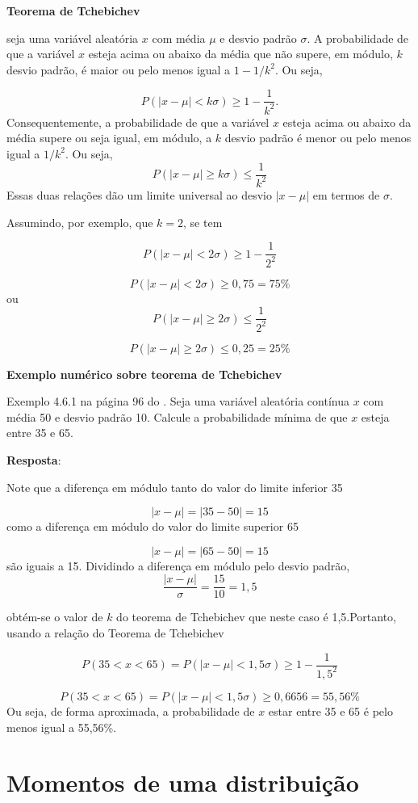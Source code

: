 \documentclass[
]{book}
\begin{document}
\textbf{Teorema de Tchebichev}

seja uma variável aleatória \(x\) com média \(\mu\) e desvio padrão \(\sigma\). A probabilidade de que a variável \(x\) esteja acima ou abaixo da média que não supere, em módulo, \(k\) desvio padrão, é maior ou pelo menos igual a \(1 - 1/k^2\). Ou seja,

\[
  P(|x - \mu| <k\sigma) \geq 1-\dfrac{1}{k^2}.
\]
Consequentemente, a probabilidade de que a variável \(x\) esteja acima ou abaixo da média supere ou seja igual, em módulo, a \(k\) desvio padrão é menor ou pelo menos igual a \(1/k^2\). Ou seja,
\[
  P(|x-\mu| \geq k\sigma) \leq \dfrac{1}{k^2}
\]
Essas duas relações dão um limite universal ao desvio \(|x-\mu|\) em termos de \(\sigma\).

Assumindo, por exemplo, que \(k = 2\), se tem

\[
  P(|x - \mu| <2\sigma) \geq 1-\dfrac{1}{2^2}
\]

\[
  P(|x - \mu| <2\sigma) \geq 0,75 = 75\%
\]
ou
\[
  P(|x-\mu| \geq 2\sigma) \leq \dfrac{1}{2^2}
\]

\[
  P(|x-\mu| \geq 2\sigma) \leq 0,25 = 25\%
\]

\textbf{Exemplo numérico sobre teorema de Tchebichev}

Exemplo 4.6.1 na página 96 do \citet{Sartoris2013}. Seja uma variável aleatória contínua \(x\) com média 50 e desvio padrão 10. Calcule a probabilidade mínima de que \(x\) esteja entre 35 e 65.

\textbf{Resposta}:

Note que a diferença em módulo tanto do valor do limite inferior 35

\[
  |x - \mu| = |35 - 50| = 15
\]
como a diferença em módulo do valor do limite superior 65

\[
  |x - \mu| = |65 - 50| = 15
\]
são iguais a 15. Dividindo a diferença em módulo pelo desvio padrão,
\[
  \dfrac{|x - \mu|}{\sigma} = \dfrac{15}{10} = 1,5
\]

obtém-se o valor de \(k\) do teorema de Tchebichev que neste caso é 1,5.Portanto, usando a relação do Teorema de Tchebichev

\[
  P(35 < x < 65) = P(|x - \mu| < 1,5 \sigma)  \geq 1 - \dfrac{1}{1,5^2}
\]

\[
  P(35 < x < 65) = P(|x - \mu| < 1,5 \sigma) \geq 0,6656 = 55,56\%
\]
Ou seja, de forma aproximada, a probabilidade de \(x\) estar entre 35 e 65 é pelo menos igual a 55,56\%.

\hypertarget{momentos-de-uma-distribuiuxe7uxe3o}{%
\section{Momentos de uma distribuição}\label{momentos-de-uma-distribuiuxe7uxe3o}}
\end{document}
